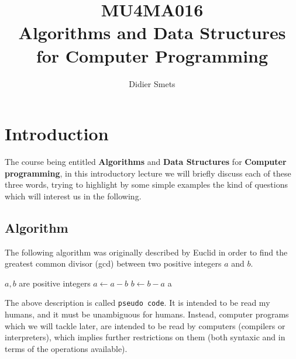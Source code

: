 \documentclass[12pt]{article}
\title{MU4MA016\\Algorithms and Data Structures\\for Computer Programming}
\author{Didier Smets}
\date{}
\theoremstyle{plain}
\theoremstyle{remark}
\begin{document}
\maketitle

\tableofcontents

\pagebreak

\section{Introduction}

The course being entitled {\bf Algorithms} and {\bf Data Structures} for {\bf
Computer programming}, in this introductory lecture we will briefly discuss each 
of these three words, trying to highlight by some simple examples the kind of
questions which will interest us in the following.

\subsection{Algorithm}

The following algorithm was originally described by Euclid in order to find
the greatest common divisor (gcd) between two positive integers $a$ and $b$.

\begin{algorithm}[H]
\caption{Euclid's algorithm (original version)}
\begin{algorithmic}
\Require $a, b$ are positive integers
\State $a \gets a - b$
\Else{}
\State $b \gets b - a$
\EndIf
\EndWhile
\State \Return a
\EndFunction
\end{algorithmic}
\end{algorithm}

The above description is called {\tt pseudo code}. It is intended to be read my
humans, and it must be unambiguous for humans. Instead, computer programs which
we will tackle later, are intended to be read by computers (compilers or
interpreters), which implies further restrictions on them (both syntaxic and
in terms of the operations available). 
\end{document}
